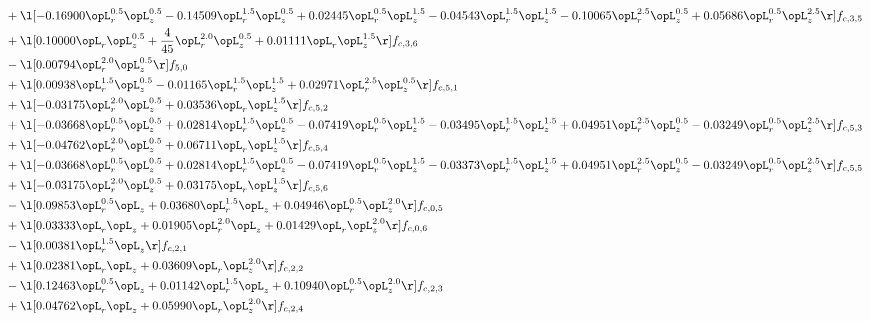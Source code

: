 \begin{alignat}{2}
& + \l[  -0.16900 \opL_r^{0.5} \opL_z^{0.5}   -0.14509 \opL_r^{1.5} \opL_z^{0.5} +  0.02445 \opL_r^{0.5} \opL_z^{1.5}   -0.04543 \opL_r^{1.5} \opL_z^{1.5}   -0.10065 \opL_r^{2.5} \opL_z^{0.5} +  0.05686 \opL_r^{0.5} \opL_z^{2.5}  \r] f_{c,3,5} \nonumber \\ 
& + \l[  0.10000 \opL_r \opL_z^{0.5} + \frac{4}{45} \opL_r^{2.0} \opL_z^{0.5} +  0.01111 \opL_r \opL_z^{1.5}  \r] f_{c,3,6} \nonumber \\ 
& - \l[  0.00794 \opL_r^{2.0} \opL_z^{0.5}  \r] f_{5,0} \nonumber \\ 
& + \l[  0.00938 \opL_r^{1.5} \opL_z^{0.5}   -0.01165 \opL_r^{1.5} \opL_z^{1.5} +  0.02971 \opL_r^{2.5} \opL_z^{0.5}  \r] f_{c,5,1} \nonumber \\ 
& + \l[  -0.03175 \opL_r^{2.0} \opL_z^{0.5} +  0.03536 \opL_r \opL_z^{1.5}  \r] f_{c,5,2} \nonumber \\ 
& + \l[  -0.03668 \opL_r^{0.5} \opL_z^{0.5} +  0.02814 \opL_r^{1.5} \opL_z^{0.5}   -0.07419 \opL_r^{0.5} \opL_z^{1.5}   -0.03495 \opL_r^{1.5} \opL_z^{1.5} +  0.04951 \opL_r^{2.5} \opL_z^{0.5}   -0.03249 \opL_r^{0.5} \opL_z^{2.5}  \r] f_{c,5,3} \nonumber \\ 
& + \l[  -0.04762 \opL_r^{2.0} \opL_z^{0.5} +  0.06711 \opL_r \opL_z^{1.5}  \r] f_{c,5,4} \nonumber \\ 
& + \l[  -0.03668 \opL_r^{0.5} \opL_z^{0.5} +  0.02814 \opL_r^{1.5} \opL_z^{0.5}   -0.07419 \opL_r^{0.5} \opL_z^{1.5}   -0.03373 \opL_r^{1.5} \opL_z^{1.5} +  0.04951 \opL_r^{2.5} \opL_z^{0.5}   -0.03249 \opL_r^{0.5} \opL_z^{2.5}  \r] f_{c,5,5} \nonumber \\ 
& + \l[  -0.03175 \opL_r^{2.0} \opL_z^{0.5} +  0.03175 \opL_r \opL_z^{1.5}  \r] f_{c,5,6} \nonumber \\ 
& - \l[  0.09853 \opL_r^{0.5} \opL_z +  0.03680 \opL_r^{1.5} \opL_z +  0.04946 \opL_r^{0.5} \opL_z^{2.0}  \r] f_{c,0,5} \nonumber \\ 
& + \l[  0.03333 \opL_r \opL_z +  0.01905 \opL_r^{2.0} \opL_z +  0.01429 \opL_r \opL_z^{2.0}  \r] f_{c,0,6} \nonumber \\ 
& - \l[  0.00381 \opL_r^{1.5} \opL_z  \r] f_{c,2,1} \nonumber \\ 
& + \l[  0.02381 \opL_r \opL_z +  0.03609 \opL_r \opL_z^{2.0}  \r] f_{c,2,2} \nonumber \\ 
& - \l[  0.12463 \opL_r^{0.5} \opL_z +  0.01142 \opL_r^{1.5} \opL_z +  0.10940 \opL_r^{0.5} \opL_z^{2.0}  \r] f_{c,2,3} \nonumber \\ 
& + \l[  0.04762 \opL_r \opL_z +  0.05990 \opL_r \opL_z^{2.0}  \r] f_{c,2,4} \nonumber \\ 

\end{alignat}
